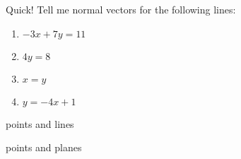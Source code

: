 \documentclass{ximera}
\begin{document}
\begin{problem}
  Quick! Tell me normal vectors for the following lines:
  \begin{enumerate}
  \item $-3x+7y=11$
  \item $4y =8$
  \item $x=y$
  \item $y=-4x+1$
  \end{enumerate}
\end{problem}



points and lines

points and planes
\end{document}

